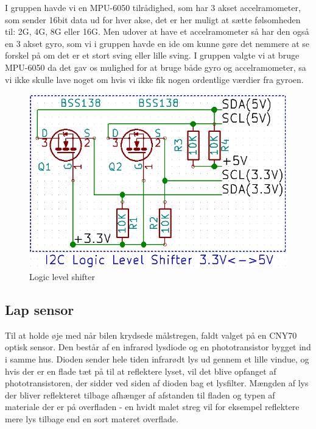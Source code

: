 I gruppen havde vi en MPU-6050 tilrådighed, som har 3 akset accelramometer, som sender 16bit data ud for hver akse, det er her muligt at sætte følsomheden til: \textpm 2G, 4G, 8G eller 16G. Men udover at have et accelramometer så har den også en 3 akset gyro, som vi i gruppen havde en ide om kunne gøre det nemmere at se forskel på om det er et stort sving eller  lille sving. I gruppen valgte vi at bruge MPU-6050 da det gav os mulighed for at bruge både gyro og accelramometer, sa vi ikke skulle lave noget om hvis vi ikke fik nogen ordentlige værdier fra gyroen.
\linebreak

\begin{figure}[h]\centering
	\includegraphics[scale=0.4]{Billeder/LogicLevelShifter.PNG}
	\caption{Logic level shifter}
	\label{fig:LogiLevelShifter}
\end{figure}


\subsection{Lap sensor}

Til at holde øje med når bilen krydsede målstregen, faldt valget på en CNY70 optisk sensor. Den består af en infrarød lysdiode og en phototransistor bygget ind i samme hus. Dioden sender hele tiden infrarødt lys ud gennem et lille vindue, og hvis der er en flade tæt på til at reflektere lyset, vil det blive opfanget af phototransistoren, der sidder ved siden af dioden bag et lysfilter. Mængden af lys der bliver reflekteret tilbage afhænger af afstanden til fladen og typen af materiale der er på overfladen - en hvidt malet streg vil for eksempel reflektere mere lys tilbage end en sort materet overflade.

